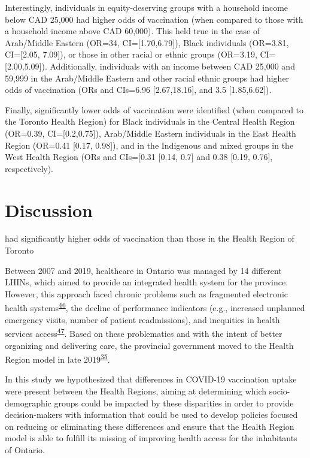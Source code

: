 \documentclass[
  letterpaper,
  DIV=11,
  numbers=noendperiod]{scrartcl}
\begin{document}
Interestingly, individuals in equity-deserving groups with a household
income below CAD 25,000 had higher odds of vaccination (when compared to
those with a household income above CAD 60,000). This held true in the
case of Arab/Middle Eastern (OR=34, CI={[}1.70,6.79{]}), Black
individuals (OR=3.81, CI={[}2.05, 7.09{]}), or those in other racial or
ethnic groups (OR=3.19, CI={[}2.00,5.09{]}). Additionally, individuals
with an income between CAD 25,000 and 59,999 in the Arab/Middle Eastern
and other racial ethnic groups had higher odds of vaccination (ORs and
CIs=6.96 {[}2.67,18.16{]}, and 3.5 {[}1.85,6.62{]}).

Finally, significantly lower odds of vaccination were identified (when
compared to the Toronto Health Region) for Black individuals in the
Central Health Region (OR=0.39, CI={[}0.2,0.75{]}), Arab/Middle Eastern
individuals in the East Health Region (OR=0.41 {[}0.17, 0.98{]}), and in
the Indigenous and mixed groups in the West Health Region (ORs and
CIs={[}0.31 {[}0.14, 0.7{]} and 0.38 {[}0.19, 0.76{]}, respectively).

\hypertarget{discussion}{%
\section{Discussion}\label{discussion}}

had significantly higher odds of vaccination than those in the Health
Region of Toronto

Between 2007 and 2019, healthcare in Ontario was managed by 14 different
LHINs, which aimed to provide an integrated health system for the
province. However, this approach faced chronic problems such as
fragmented electronic health
systems\textsuperscript{\protect\hyperlink{ref-lysyk2016}{46}}, the
decline of performance indicators (e.g., increased unplanned emergency
visits, number of patient readmissions), and inequities in health
services access\textsuperscript{\protect\hyperlink{ref-lysyk2015}{47}}.
Based on these problematics and with the intent of better organizing and
delivering care, the provincial government moved to the Health Region
model in late
2019\textsuperscript{\protect\hyperlink{ref-dong2022}{35}}.

In this study we hypothesized that differences in COVID-19 vaccination
uptake were present between the Health Regions, aiming at determining
which socio-demographic groups could be impacted by these disparities in
order to provide decision-makers with information that could be used to
develop policies focused on reducing or eliminating these differences
and ensure that the Health Region model is able to fulfill its missing
of improving health access for the inhabitants of Ontario.
\end{document}
